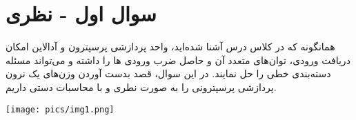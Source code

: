 \section{سوال اول - نظری}

همانگونه که در کلاس درس آشنا شده‌اید، واحد پردازشی پرسپترون و آدالاین امکان دریافت ورودی، توان‌های متعدد آن و حاصل ضرب ورودی ها را داشته و می‌تواند مسئله دسته‌بندی خطی را حل نمایند. در این سوال، قصد بدست آوردن وزن‌های یک نرون پردازشی پرسپترونی را به صورت نطری و با محاسبات دستی داریم.




\begin{center}
	\texttt{[image: pics/img1.png]}
	\label{مسئله مورد بحث در سوال۱}
\end{center}



